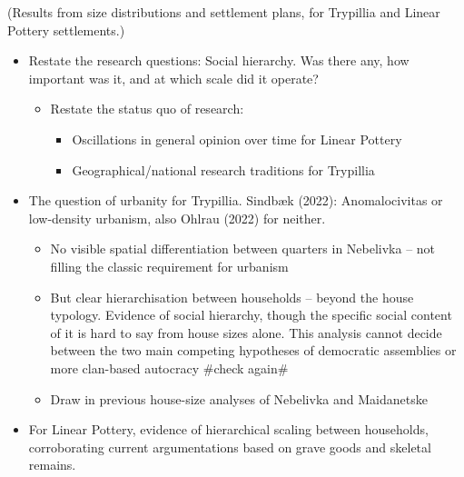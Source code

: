 \documentclass[
  12pt,
  a4paper, twoside]{book}
\begin{document}
(Results from size distributions and settlement plans, for Trypillia and Linear Pottery settlements.)

\begin{itemize}
\item
  Restate the research questions: Social hierarchy. Was there any, how important was it, and at which scale did it operate?

  \begin{itemize}
  \item
    Restate the status quo of research:

    \begin{itemize}
    \item
      Oscillations in general opinion over time for Linear Pottery
    \item
      Geographical/national research traditions for Trypillia
    \end{itemize}
  \end{itemize}
\item
  The question of urbanity for Trypillia. Sindbæk (2022): Anomalocivitas or low-density urbanism, also Ohlrau (2022) for neither.

  \begin{itemize}
  \item
    No visible spatial differentiation between quarters in Nebelivka -- not filling the classic requirement for urbanism
  \item
    But clear hierarchisation between households -- beyond the house typology. Evidence of social hierarchy, though the specific social content of it is hard to say from house sizes alone. This analysis cannot decide between the two main competing hypotheses of democratic assemblies or more clan-based autocracy \#check again\#
  \item
    Draw in previous house-size analyses of Nebelivka and Maidanetske
  \end{itemize}
\item
  For Linear Pottery, evidence of hierarchical scaling between households, corroborating current argumentations based on grave goods and skeletal remains.


\end{itemize}
\end{document}
